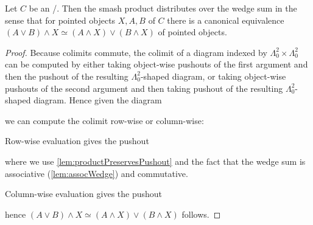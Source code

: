 \begin{lemma}\label{lem:smashDist}
    Let $C$ be an \inftytop/.
    Then the smash product distributes over the wedge sum in the sense that for pointed objects $X,A,B$ of $C$ there is a canonical equivalence $(A\vee B)\wedge X\simeq (A\wedge X)\vee (B\wedge X)$ of pointed objects.
    \begin{proof}
        Because colimits commute, the colimit of a diagram indexed by $\Lambda_0^2\times\Lambda_0^2$ can be computed by either taking object-wise pushouts of the first argument and then the pushout of the resulting $\Lambda_0^2$-shaped diagram, or taking object-wise pushouts of the second argument and then taking pushout of the resulting $\Lambda_0^2$-shaped diagram.
        Hence given the diagram
        \begin{center}
        \end{center}
        we can compute the colimit row-wise or column-wise:

        Row-wise evaluation gives the pushout 
        \begin{center}
        \end{center}
        where we use \cref{lem:productPreservesPushout} and the fact that the wedge sum is associative (\cref{lem:assocWedge}) and commutative.

        Column-wise evaluation gives the pushout 
        \begin{center}
        \end{center}
        hence $(A\vee B)\wedge X\simeq(A\wedge X)\vee (B\wedge X)$ follows.
    \end{proof}
\end{lemma}
